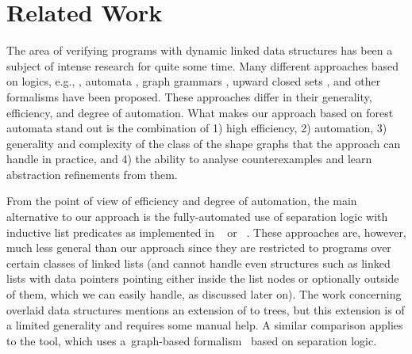 {%

\section{Related Work} 
The area of verifying programs with dynamic linked
data structures has been a subject of intense research for quite some time. Many
different approaches based on logics, e.g.,
\cite{pale01,pale,Reynolds:SepLogic:02,InvaderCAV07,indPrSynt07,ndqc07,Zee:pldi08,InvaderCAV08,abduction11,mpq11,slayer11,predator11,overlaid11,indPrSynt07,thor10,sas07:chang_rival_necula},
automata \cite{bhrv06b,lists-counters,deg06}, graph grammars \cite{juggrnaut10,juggrnaut-learning12}, upward closed sets \cite{paroshBackward},
and other formalisms have been proposed. These approaches differ in their
generality, efficiency, and degree of automation.  
%
What makes our approach based on forest automata stand out is the combination of
1) high efficiency,
2) automation,
3) generality and complexity of the class of the shape graphs that the approach can handle in practice, and
4) the ability to analyse counterexamples and learn abstraction refinements from them.

%
%

From the point of view of efficiency and degree of automation, the main
alternative to our approach is the fully-automated use of separation logic with
inductive list predicates as implemented in \spaceinvader~\cite{InvaderCAV08} or
\slayer~\cite{slayer11}. These approaches are, however, much less general than
our approach since they are restricted to programs over certain classes of
linked lists (and cannot handle even structures such as linked lists with data
pointers pointing either inside the list nodes or optionally outside of them,
which we can easily handle, as discussed later on). 
The work \cite{overlaid11} concerning overlaid data
structures mentions an extension of \spaceinvader to trees, but this extension
is of a limited generality and requires some manual help.
A similar comparison applies
to the \predator tool, which uses a~graph-based
formalism~\cite{predator11} based on separation logic.


}
